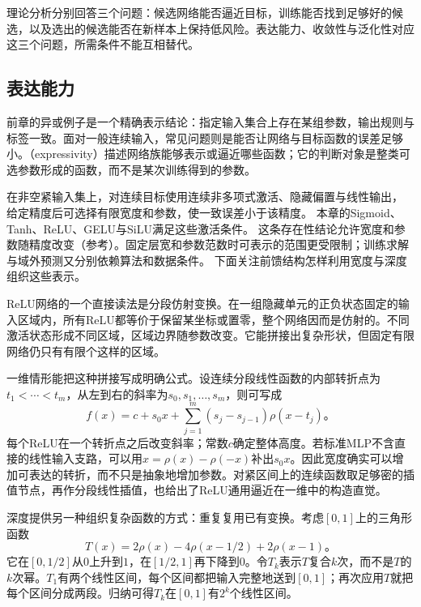 理论分析分别回答三个问题：候选网络能否逼近目标，训练能否找到足够好的候选，以及选出的候选能否在新样本上保持低风险。表达能力、收敛性与泛化性对应这三个问题，所需条件不能互相替代。

\subsection{表达能力}
\label{sec:ffn-expressivity}

前章的异或例子是一个精确表示结论：指定输入集合上存在某组参数，输出规则与标签一致。面对一般连续输入，常见问题则是能否让网络与目标函数的误差足够小。（expressivity）描述网络族能够表示或逼近哪些函数；它的判断对象是整类可选参数形成的函数，而不是某次训练得到的参数。

在非空紧输入集上，对连续目标使用连续非多项式激活、隐藏偏置与线性输出，
给定精度后可选择有限宽度和参数，使一致误差小于该精度。
本章的Sigmoid、Tanh、ReLU、GELU与SiLU满足这些激活条件。
这条存在性结论允许宽度和参数随精度改变（参考）。固定层宽和参数范数时可表示的范围更受限制；训练求解与域外预测又分别依赖算法和数据条件。
下面关注前馈结构怎样利用宽度与深度组织这些表示。

ReLU网络的一个直接读法是分段仿射变换。在一组隐藏单元的正负状态固定的输入区域内，所有ReLU都等价于保留某坐标或置零，整个网络因而是仿射的。不同激活状态形成不同区域，区域边界随参数改变。它能拼接出复杂形状，但固定有限网络仍只有有限个这样的区域。

一维情形能把这种拼接写成明确公式。设连续分段线性函数的内部转折点为$t_1<\cdots<t_m$，从左到右的斜率为$s_0,s_1,\ldots,s_m$，则可写成
\begin{equation}
  f(x)=c+s_0x+
  \sum_{j=1}^{m}(s_j-s_{j-1})\rho(x-t_j)\text{。}
  \label{eq:ffn-piecewise-linear-representation}
\end{equation}
每个ReLU在一个转折点之后改变斜率；常数$c$确定整体高度。若标准MLP不含直接的线性输入支路，可以用$x=\rho(x)-\rho(-x)$补出$s_0x$。因此宽度确实可以增加可表达的转折，而不只是抽象地增加参数。对紧区间上的连续函数取足够密的插值节点，再作分段线性插值，也给出了ReLU通用逼近在一维中的构造直觉。

深度提供另一种组织复杂函数的方式：重复复用已有变换。考虑$[0,1]$上的三角形函数
\begin{equation}
  T(x)=2\rho(x)-4\rho(x-1/2)+2\rho(x-1)\text{。}
  \label{eq:ffn-tent-function}
\end{equation}
它在$[0,1/2]$从$0$上升到$1$，在$[1/2,1]$再下降到$0$。令$T_k$表示$T$复合$k$次，而不是$T$的$k$次幂。$T_1$有两个线性区间，每个区间都把输入完整地送到$[0,1]$；再次应用$T$就把每个区间分成两段。归纳可得$T_k$在$[0,1]$有$2^k$个线性区间。

